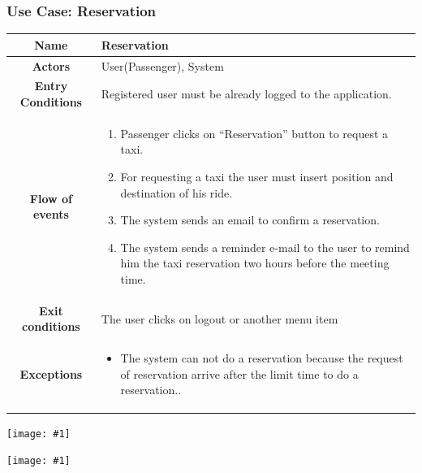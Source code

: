 \documentclass[11pt, a4paper,titlepage]{article}
\newcommand{\image}[1]{
	\begin{center}
		\noindent \texttt{[image: \#1]}
	\end{center}
	}
\begin{document}
\subsubsection{Use Case: Reservation}
		\begin{tabularx}{\textwidth}{| c | X |}
			\hline
			\textbf{Name} & 
			Reservation
			\\
			\hline
			\textbf{Actors} & 
			User(Passenger), System 
			\\
			\hline
			\textbf{Entry Conditions} &
			Registered user must be already logged to the application. 
			\\
			\hline
			\textbf{Flow of events} & 
			\begin{enumerate}
				\item Passenger clicks on “Reservation” button to request a taxi.
				\item For requesting a taxi the user must insert position and destination of his ride.
				\item The system sends an email to confirm a reservation.
				\item The system sends a reminder e-mail to the user to remind him the taxi  reservation two hours before the meeting time.
			\end{enumerate}						
			\\
			\hline
			\textbf{Exit conditions} & 
			The user clicks on logout or another menu item
			\\
			\hline
			\textbf{Exceptions} & 
			\begin{itemize}
				\item The system can not do a reservation because the request of reservation arrive after the limit time to do a reservation..
			\end{itemize} 
			\\
			\hline		
		\end{tabularx}
		\image{usecase_reservation.png}
		\image{diagram_sequence_reservation.png}
		\newpage
\end{document}
